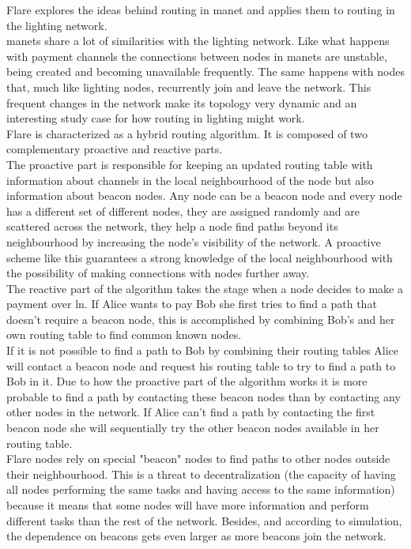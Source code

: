 Flare \cite{flare} explores the ideas behind routing in \acrfull{manet} and applies them to routing in the lighting network.\\
\acrshort{manet}s share a lot of similarities with the lighting network. Like what happens with payment channels the connections between nodes in \acrshort{manet}s are unstable, being created and becoming unavailable frequently. The same happens with nodes that, much like lighting nodes, recurrently join and leave the network. This frequent changes in the network make its topology very dynamic and an interesting study case for how routing in lighting might work. \\
Flare is characterized as a hybrid routing algorithm. It is composed of two complementary proactive and reactive parts.\\
The proactive part is responsible for keeping an updated routing table with information about channels in the local neighbourhood of the node but also information about beacon nodes. Any node can be a beacon node and every node has a different set of different nodes, they are assigned randomly and are scattered across the network, they help a node find paths beyond its neighbourhood by increasing the node's visibility of the network. A proactive scheme like this guarantees a strong knowledge of the local neighbourhood with the possibility of making connections with nodes further away. \\ 
The reactive part of the algorithm takes the stage when a node decides to make a payment over \acrshort{ln}. If Alice wants to pay Bob she first tries to find a path that doesn't require a beacon node, this is accomplished by combining Bob's and her own routing table to find common known nodes. \\
If it is not possible to find a path to Bob by combining their routing tables Alice will contact a beacon node and request his routing table to try to find a path to Bob in it. Due to how the proactive part of the algorithm works it is more probable to find a path by contacting these beacon nodes than by contacting any other nodes in the network. If Alice can't find a path by contacting the first beacon node she will sequentially try the other beacon nodes available in her routing table.\\
Flare nodes rely on special "beacon" nodes to find paths to other nodes outside their neighbourhood. This is a threat to decentralization (the capacity of having all nodes performing the same tasks and having access to the same information) because it means that some nodes will have more information and perform different tasks than the rest of the network. Besides, and according to simulation, the dependence on beacons gets even larger as more beacons join the network. \\
